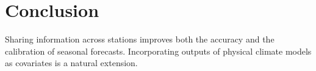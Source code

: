 \chapter{Conclusion}
\label{ch:conclusion}

Sharing information across stations improves both the accuracy and the calibration of seasonal
forecasts. Incorporating outputs of physical climate models as covariates is a natural extension.
